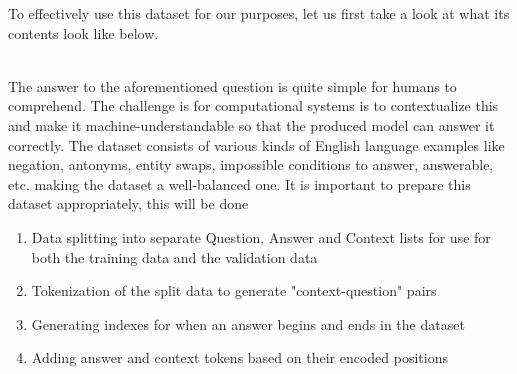 \documentclass[a4paper,12pt]{report}
\begin{document}
	    To effectively use this dataset for our purposes, let us first take a look at what its contents look like below.\\ \\
	    \noindent{}
	    \newline
	    \newline

	    The answer to the aforementioned question is quite simple for humans to comprehend. The challenge is for computational systems is to contextualize this and make it machine-understandable so that the produced model can answer it correctly.
	    The dataset consists of various kinds of English language examples like negation, antonyms, entity swaps, impossible conditions to answer, answerable, etc. making the dataset a well-balanced one.
	    It is important to prepare this dataset appropriately, this will be done

	    \begin{enumerate}
	    	\item Data splitting into separate Question, Answer and Context lists for use for both the training data and the validation data
	    	\item Tokenization of the split data to generate "context-question" pairs
	    	\item Generating indexes for when an answer begins and ends in the dataset
	    	\item Adding answer and context tokens based on their encoded positions
	    \end{enumerate}
\end{document}
